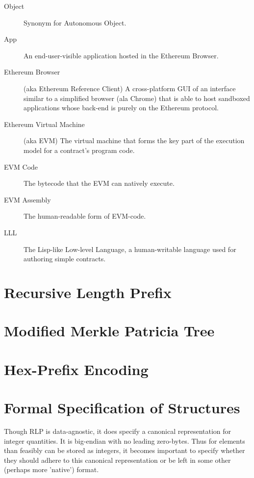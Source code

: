 \documentclass[9pt,oneside]{amsart}
\begin{document}
\begin{multicols}{2}
\begin{description}
\item[Object] Synonym for Autonomous Object.

\item[App] An end-user-visible application hosted in the Ethereum Browser.

\item[Ethereum Browser] (aka Ethereum Reference Client) A cross-platform GUI of an interface similar to a simplified browser (ala Chrome) that is able to host sandboxed applications whose back-end is purely on the Ethereum protocol.

\item[Ethereum Virtual Machine] (aka EVM) The virtual machine that forms the key part of the execution model for a contract's program code.

\item[EVM Code] The bytecode that the EVM can natively execute.

\item[EVM Assembly] The human-readable form of EVM-code.

\item[LLL] The Lisp-like Low-level Language, a human-writable language used for authoring simple contracts.

\end{description}

\section{Recursive Length Prefix}\label{app:rlp}

\section{Modified Merkle Patricia Tree}\label{app:trie}

\section{Hex-Prefix Encoding}\label{app:hexprefix}

\section{Formal Specification of Structures}

Though RLP is data-agnostic, it does specify a canonical representation for integer quantities. It is big-endian with no leading zero-bytes. Thus for elements than feasibly can be stored as integers, it becomes important to specify whether they should adhere to this canonical representation or be left in some other (perhaps more 'native') format.


\end{multicols}
\end{document}

